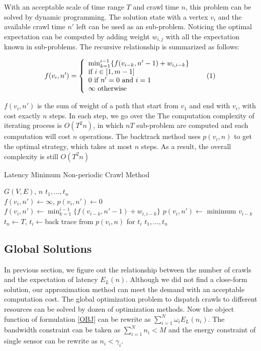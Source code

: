 \documentclass[conference]{IEEEtran}
\newcommand\numberthis{\addtocounter{equation}{1}\tag{\theequation}}
\begin{document}
With an acceptable scale of time range $T$ and crawl time $n$, this problem can be solved by dynamic programming. The solution state with a vertex $v_i$ and the available crawl time $n'$ left can be used as an sub-problem. Noticing the optimal expectation can be computed by adding weight $w_{i,j}$ with all the expectation known in sub-problems. The recursive relationship is summarized as follows:

\[f(v_i, n')=\left\{
    \begin{array}{lr}
	\min_{k=1}^{i-1}\{f(v_{i-k}, n'-1)+w_{i,i-k}\}\\
    \text{if }i\in[1, m-1]\\
    0\text{ if }n'=0\text{ and }i=1\\
    \infty\text{ otherwise}
    \end{array}\numberthis \label{dp}
    \right.
\]


$f(v_i,n')$ is the sum of weight of a path that start from $v_1$ and end with $v_i$, with cost exactly $n$ steps. In each step, we go over the  The computation complexity of iterating process is $O(T^2n)$, in which $nT$ sub-problem are computed and each computation will cost $n$ operations. The backtrack method uses $p(v_i, n)$ to get the optimal strategy, which takes at most $n$ steps. As a result, the overall complexity is still $O(T^2n)$ 

\begin{algorithm}
\caption{Latency Minimum Non-periodic Crawl Method}
  \label{alg:dp_min}
  \begin{algorithmic}[1]
  \renewcommand{\algorithmicrequire}{\textbf{Input:}}
  \renewcommand{\algorithmicensure}{\textbf{Output:}}
  \REQUIRE $G(V,E)$, $n$
  \ENSURE  $t_1,\ldots,t_n$
  \\
  \STATE $f(v_i,n') \gets \infty$, $p(v_i,n')\gets 0$
      \STATE $f(v_i,n')\gets\min_{k=1}^{i-1}\{f(v_{i-k}, n'-1)+w_{i,i-k}\}$
      \STATE $p(v_i,n')\gets$ minimum $v_{i-k}$
    \ENDFOR
  \ENDFOR
  \STATE $t_n\gets T$, $t_i\gets$back trace from $p(v_i, n)$ for $t_i$
  \RETURN $t_1,\ldots,t_n$
  \end{algorithmic}
\end{algorithm}

\subsection{Global Solutions}
In previous section, we figure out the relationship between the number of crawls and the expectation of latency $E_L(n)$. Although we did not find a close-form solution, our approximation method can meet the demand with an acceptable computation cost. The global optimization problem to dispatch crawls to different resources can be solved by dozen of optimization methods.
Now the object function of formulation \ref{OBJ} can be rewrite as $\sum_{i=1}^{N} \omega_i E_L(n_i)$. The bandwidth constraint can be taken as $\sum_{i=1}^{N} n_i < M$ and the energy constraint of single sensor can be rewrite as $n_i<\gamma_i$.
\end{document}
